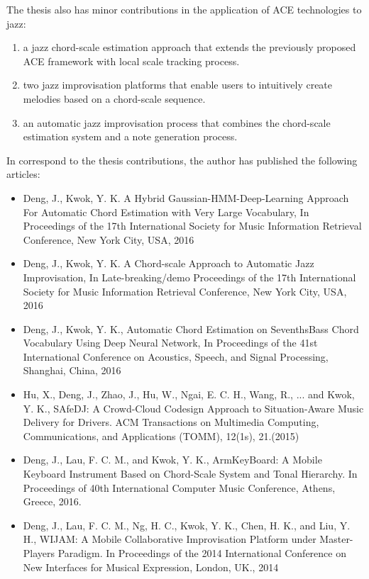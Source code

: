 The thesis also has minor contributions in the application of ACE technologies to jazz:
\begin{enumerate}
\item a jazz chord-scale estimation approach that extends the previously proposed ACE framework with local scale tracking process.
\item two jazz improvisation platforms that enable users to intuitively create melodies based on a chord-scale sequence.
\item an automatic jazz improvisation process that combines the chord-scale estimation system and a note generation process.
\end{enumerate}

In correspond to the thesis contributions, the author has published the following articles:
\begin{itemize}
\item Deng, J., Kwok, Y. K. A Hybrid Gaussian-HMM-Deep-Learning Approach For Automatic Chord Estimation with Very Large Vocabulary, In Proceedings of the 17th International Society for Music Information Retrieval Conference, New York City, USA, 2016
\item Deng, J., Kwok, Y. K. A Chord-scale Approach to Automatic Jazz Improvisation, In Late-breaking/demo Proceedings of the 17th International Society for Music Information Retrieval Conference, New York City, USA, 2016
\item Deng, J., Kwok, Y. K., Automatic Chord Estimation on SeventhsBass Chord Vocabulary Using Deep Neural Network, In Proceedings of the 41st International Conference on Acoustics, Speech, and Signal Processing, Shanghai, China, 2016
\item Hu, X., Deng, J., Zhao, J., Hu, W., Ngai, E. C. H., Wang, R., ... and Kwok, Y. K., SAfeDJ: A Crowd-Cloud Codesign Approach to Situation-Aware Music Delivery for Drivers. ACM Transactions on Multimedia Computing, Communications, and Applications (TOMM), 12(1s), 21.(2015)
\item Deng, J., Lau, F. C. M., and Kwok, Y. K., ArmKeyBoard: A Mobile Keyboard Instrument Based on Chord-Scale System and Tonal Hierarchy. In Proceedings of 40th International Computer Music Conference, Athens, Greece, 2016.
\item Deng, J., Lau, F. C. M., Ng, H. C., Kwok, Y. K., Chen, H. K., and Liu, Y. H., WIJAM: A Mobile Collaborative Improvisation Platform under Master-Players Paradigm. In Proceedings of the 2014 International Conference on New Interfaces for Musical Expression, London, UK., 2014
\end{itemize}

